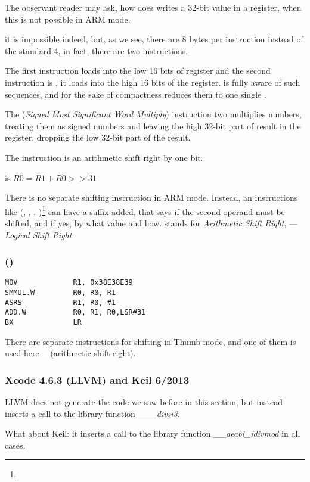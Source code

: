 
The observant reader may ask, how does \MOV writes a 32-bit value in a register, when this is not possible in ARM mode.

it is impossible indeed, but, as we see,
there are 8 bytes per instruction instead of the standard 4,
in fact, there are two instructions.

The first instruction loads  into the low 16 bits of register and the second instruction is
, it loads  into the high 16 bits of the register.
\IDA is fully aware of such sequences, and for the sake of compactness reduces them to one single .

The  (\emph{Signed Most Significant Word Multiply}) 
instruction two multiplies numbers, treating them as signed numbers
and leaving the high 32-bit part of result in the  register,
dropping the low 32-bit part of the result.

The instruction is an arithmetic shift right by one bit.

 is $R0=R1 + R0>>31$

\label{shifts_in_ARM_mode}

There is no separate shifting instruction in ARM mode.
Instead, an instructions like 
(\MOV, \ADD, \SUB, )\footnote{\DataProcessingInstructionsFootNote}
can have a suffix added, that says if the second operand must be shifted, and if yes, by what value and how.
 stands for \emph{Arithmetic Shift Right}, ---\emph{Logical Shift Right}.

\subsubsection{\OptimizingXcodeIV (\ThumbTwoMode)}

\begin{lstlisting}[style=customasmARM]
MOV             R1, 0x38E38E39
SMMUL.W         R0, R0, R1
ASRS            R1, R0, #1
ADD.W           R0, R1, R0,LSR#31
BX              LR
\end{lstlisting}


There are separate instructions for shifting in Thumb mode, 
and one of them is used here--- (arithmetic shift right).

\subsubsection{\NonOptimizing Xcode 4.6.3 (LLVM) and Keil 6/2013}

\NonOptimizing LLVM
does not generate the code we saw before in this section, but instead inserts a call to the library function 
\emph{\_\_\_divsi3}.

What about Keil: it inserts a call to the library function \emph{\_\_aeabi\_idivmod} in all cases.
